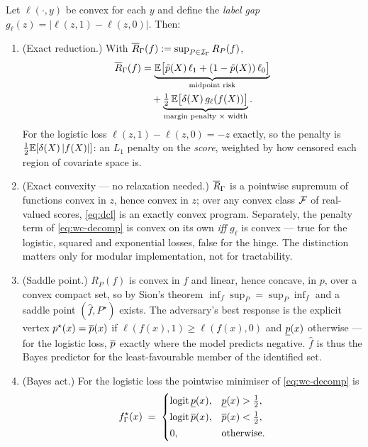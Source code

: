 \begin{theorem}
\label{thm:dcl}
Let $\ell(\cdot,y)$ be convex for each $y$ and define the \emph{label gap}
$g_\ell(z) = |\ell(z,1)-\ell(z,0)|$. Then:
\begin{enumerate}
\item[(a)] \textup{(Exact reduction.)} With $\overline{R}_\Gamma(f):=\sup_{P\in\mathcal{I}_\Gamma}R_P(f)$,
\begin{equation}
\begin{aligned}
  \overline{R}_\Gamma(f)
  &= \underbrace{\mathbb{E}\big[\tilde p(X)\,\ell_1 + (1-\tilde p(X))\,\ell_0\big]}
             _{\text{midpoint risk}}\\
  &\quad + \underbrace{\tfrac12\,\mathbb{E}\big[\delta(X)\,g_\ell(f(X))\big]}
             _{\text{margin penalty $\times$ width}} .
\end{aligned}
  \label{eq:wc-decomp}
\end{equation}
For the logistic loss $\ell(z,1)-\ell(z,0) = -z$ exactly, so the penalty is
$\tfrac12\mathbb{E}[\delta(X)\,|f(X)|]$: an $L_1$ penalty on the \emph{score}, weighted
by how censored each region of covariate space is.

\item[(b)] \textup{(Exact convexity --- no relaxation needed.)} $\overline{R}_\Gamma$
is a pointwise supremum of functions convex in $z$, hence convex in $z$; over
any convex class $\mathcal{F}$ of real-valued scores, \eqref{eq:dcl} is an exactly convex
program. Separately, the penalty term of \eqref{eq:wc-decomp} is convex on its
own \emph{iff} $g_\ell$ is convex --- true for the logistic, squared and
exponential losses, false for the hinge. The distinction matters only for
modular implementation, not for tractability.

\item[(c)] \textup{(Saddle point.)} $R_P(f)$ is convex in $f$ and linear, hence
concave, in $p$, over a convex compact set, so by Sion's theorem
\citep{sion1958general} $\inf_f\sup_P = \sup_P\inf_f$ and a saddle point
$(\hat f, P^\star)$ exists. The adversary's best response is the explicit vertex
$p^\star(x)=\overline{p}(x)$ if $\ell(f(x),1)\ge\ell(f(x),0)$ and $\underline{p}(x)$
otherwise --- for the logistic loss, $\overline{p}$ exactly where the model predicts
negative.
$\hat f$ is thus the Bayes predictor for the least-favourable member of the
identified set.

\item[(d)] \textup{(Bayes act.)} For the logistic loss the pointwise minimiser
of \eqref{eq:wc-decomp} is
\begin{equation}
  f^\star_\Gamma(x)
  \;=\;
  \begin{cases}
    \operatorname{logit} \underline{p}(x), & \underline{p}(x) > \tfrac12,\\[2pt]
    \operatorname{logit} \overline{p}(x), & \overline{p}(x) < \tfrac12,\\[2pt]
    0, & \text{otherwise.}
  \end{cases}
  \label{eq:bayes-act}
\end{equation}
\end{enumerate}
\end{theorem}

